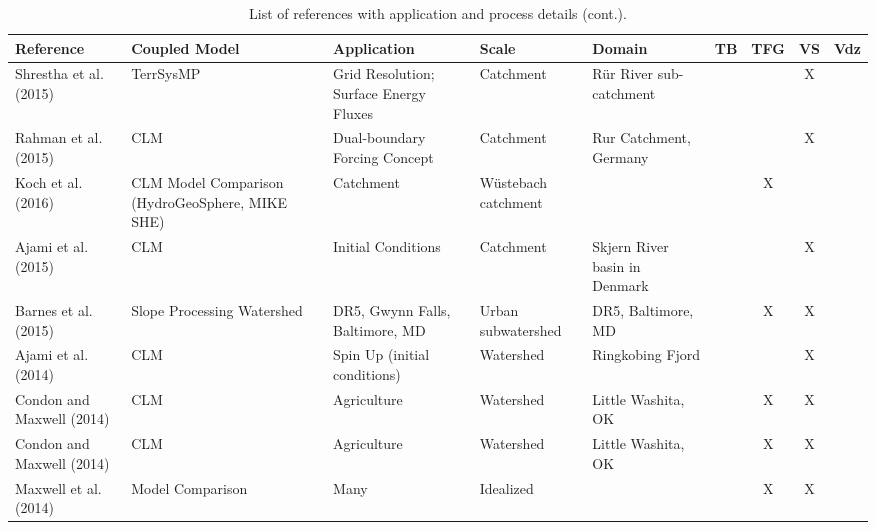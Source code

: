 {\begin{table}
\begin{tabular}{ l  p{1.5cm} p{2cm} p{1.5cm} p{1.5cm} | c | c | c | c }
\end{tabular}
\label{pfref7}
\end{table}


\begin{table} \center
\renewcommand{\arraystretch}{2.5}
\center
\caption{List of \parflow{} references with application and process details (cont.).}
\begin{tabular}{ l  p{1.5cm} p{2cm} p{1.5cm} p{1.5cm} | c | c | c | c }
\bf{Reference} & \bf{Coupled Model} & \bf{Application} & \bf{Scale} & \bf{Domain} & \bf{TB} & \bf{TFG} & \bf{VS} & \bf{Vdz} \\   
\hline{}

\cite{Shrestha2015} Shrestha et al. (2015) & TerrSysMP & Grid Resolution; Surface Energy Fluxes & Catchment & R{\"u}r River sub-catchment  & & & X & \\	
\cite{Rahman2015} Rahman et al. (2015) & CLM & Dual-boundary Forcing Concept & Catchment & Rur Catchment, Germany & & & X & \\	
\cite{Koch2016} Koch et al. (2016) &CLM	Model Comparison (HydroGeoSphere, MIKE SHE) & Catchment& W{\"u}stebach catchment & & & X & \\	
\cite{Ajami2015} Ajami et al. (2015)& CLM& Initial Conditions& Catchment& Skjern River basin in Denmark  & & & X & \\
\cite{Barnes2015} Barnes et al. (2015)& Slope Processing Watershed & DR5, Gwynn Falls, Baltimore, MD  & Urban subwatershed & DR5, Baltimore, MD &  &X & X & \\	
\cite{Ajami14} Ajami et al. (2014) & CLM & Spin Up (initial conditions) & Watershed & Ringkobing Fjord &   &   & X &     \\
\cite{Condon14a} Condon and Maxwell (2014) & CLM & Agriculture & Watershed & Little Washita, OK &   & X & X &     \\
\cite{Condon14b} Condon and Maxwell (2014) & CLM & Agriculture & Watershed & Little Washita, OK &  & X& X &     \\
\cite{M14} Maxwell et al. (2014) & Model Comparison & Many  & Idealized  &   &   & X & X &     \\ 

\end{tabular}
\label{pfref6}
\end{table}

}
